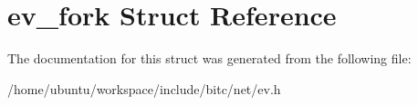 \hypertarget{structev__fork}{\section{ev\-\_\-fork Struct Reference}
\label{structev__fork}
}


The documentation for this struct was generated from the following file\-:\begin{DoxyCompactItemize}
\item 
/home/ubuntu/workspace/include/bitc/net/ev.\-h\end{DoxyCompactItemize}
